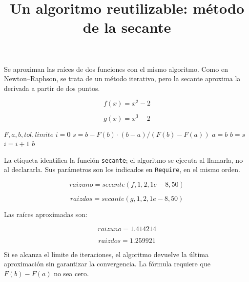 \documentclass{article}
\title{Un algoritmo reutilizable: m\'etodo de la secante}
\date{}
\begin{document}
\maketitle

Se aproximan las ra\'ices de dos funciones con el mismo algoritmo.
Como en Newton--Raphson, se trata de un m\'etodo iterativo, pero la
secante aproxima la derivada a partir de dos puntos.

\begin{equation}
    f(x) = x^2 - 2
    \label{eq:calc:f}
\end{equation}

\begin{equation}
    g(x) = x^3 - 2
    \label{eq:calc:g}
\end{equation}

\begin{algorithm}
\caption{M\'etodo de la secante}
\label{alg:calc:secante}
\begin{algorithmic}
    \REQUIRE $F, a, b, tol, limite$
    \STATE $i = 0$
        \STATE $s = b - F(b) \cdot (b - a) / (F(b) - F(a))$
        \STATE $a = b$
        \STATE $b = s$
        \STATE $i = i + 1$
    \ENDWHILE
    \RETURN $b$
\end{algorithmic}
\end{algorithm}

La etiqueta identifica la funci\'on \texttt{secante}; el algoritmo se
ejecuta al llamarla, no al declararla. Sus par\'ametros son los indicados
en \texttt{Require}, en el mismo orden.

\begin{equation}
    raizuno = secante(f, 1, 2, 1e-8, 50)
    \label{eq:calc:raizuno}
\end{equation}

\begin{equation}
    raizdos = secante(g, 1, 2, 1e-8, 50)
    \label{eq:calc:raizdos}
\end{equation}

Las ra\'ices aproximadas son:

\begin{equation}
    raizuno =
    1.414214
    \label{eq:res:raizuno}
\end{equation}

\begin{equation}
    raizdos =
    1.259921
    \label{eq:res:raizdos}
\end{equation}

Si se alcanza el l\'imite de iteraciones, el algoritmo devuelve la
\'ultima aproximaci\'on sin garantizar la convergencia. La f\'ormula
requiere que $F(b) - F(a)$ no sea cero.
\end{document}

